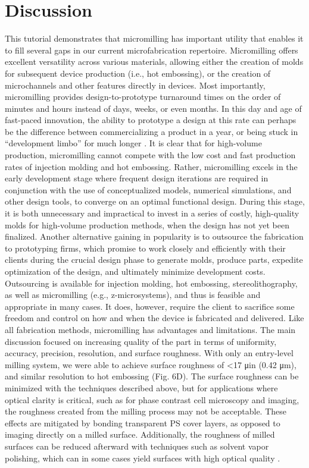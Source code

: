 \section{Discussion}
This tutorial demonstrates that micromilling has important utility that enables it to fill several gaps in our current microfabrication repertoire. Micromilling offers excellent versatility across various materials, allowing either the creation of molds for subsequent device production (i.e., hot embossing), or the creation of microchannels and other features directly in devices. Most importantly, micromilling provides design-to-prototype turnaround times on the order of minutes and hours instead of days, weeks, or even months. In this day and age of fast-paced innovation, the ability to prototype a design at this rate can perhaps be the difference between commercializing a product in a year, or being stuck in “development limbo” for much longer \cite{Chin2012}. It is clear that for high-volume production, micromilling cannot compete with the low cost and fast production rates of injection molding and hot embossing. Rather, micromilling excels in the early development stage where frequent design iterations are required in conjunction with the use of conceptualized models, numerical simulations, and other design tools, to converge on an optimal functional design. During this stage, it is both unnecessary and impractical to invest in a series of costly, high-quality molds for high-volume production methods, when the design has not yet been finalized. Another alternative gaining in popularity is to outsource the fabrication to prototyping firms, which promise to work closely and efficiently with their clients during the crucial design phase to generate molds, produce parts, expedite optimization of the design, and ultimately minimize development costs. Outsourcing is available for injection molding, hot embossing, stereolithography, as well as micromilling (e.g., z-microsystems), and thus is feasible and appropriate in many cases. It does, however, require the client to sacrifice some freedom and control on how and when the device is fabricated and delivered. 
Like all fabrication methods, micromilling has advantages and limitations. The main discussion focused on increasing quality of the part in terms of uniformity, accuracy, precision, resolution, and surface roughness. With only an entry-level milling system, we were able to achieve surface roughness of <17 μin (0.42 μm), and similar resolution to hot embossing (Fig. 6D). The surface roughness can be minimized with the techniques described above, but for applications where optical clarity is critical, such as for phase contrast cell microscopy and imaging, the roughness created from the milling process may not be acceptable. These effects are mitigated by bonding transparent PS cover layers, as opposed to imaging directly on a milled surface. Additionally, the roughness of milled surfaces can be reduced afterward with techniques such as solvent vapor polishing, which can in some cases yield surfaces with high optical quality \cite{Ogilvie2010}.

